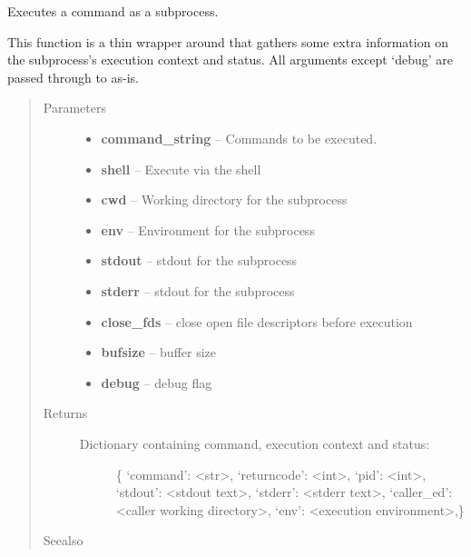 \documentclass[letterpaper,10pt,english]{sphinxmanual}
\begin{document}
\begin{fulllineitems}
\label{docs/utilities:_execute.execute}
Executes a command as a subprocess.

This function is a thin wrapper around  that gathers some extra information
on the subprocess's execution context and status.  All arguments except `debug' are passed through
to  as-is.
\begin{quote}\begin{description}
\item[{Parameters}] \leavevmode\begin{itemize}
\item {} 
\textbf{command\_string} -- Commands to be executed.

\item {} 
\textbf{shell} -- Execute via the shell

\item {} 
\textbf{cwd} -- Working directory for the subprocess

\item {} 
\textbf{env} -- Environment for the subprocess

\item {} 
\textbf{stdout} -- stdout for the subprocess

\item {} 
\textbf{stderr} -- stdout for the subprocess

\item {} 
\textbf{close\_fds} -- close open file descriptors before execution

\item {} 
\textbf{bufsize} -- buffer size

\item {} 
\textbf{debug} -- debug flag

\end{itemize}

\item[{Returns}] \leavevmode
\begin{description}
\item[{Dictionary containing command, execution context and status:}] \leavevmode
\{ `command': \textless{}str\textgreater{},
`returncode': \textless{}int\textgreater{},
`pid': \textless{}int\textgreater{},
`stdout': \textless{}stdout text\textgreater{},
`stderr': \textless{}stderr text\textgreater{},
`caller\_ed': \textless{}caller working directory\textgreater{},
`env': \textless{}execution environment\textgreater{},\}

\end{description}


\item[{Seealso }] \leavevmode
{}

\end{description}\end{quote}

\end{fulllineitems}
\end{document}
